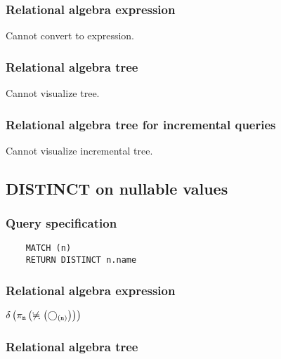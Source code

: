 	\subsubsection*{Relational algebra expression}

	Cannot convert to expression.

	\subsubsection*{Relational algebra tree}

	Cannot visualize tree.

	\subsubsection*{Relational algebra tree for incremental queries}

	Cannot visualize incremental tree.
	\subsection{DISTINCT on nullable values}

	\subsubsection*{Query specification}

	\begin{lstlisting}
	MATCH (n)
	RETURN DISTINCT n.name
	\end{lstlisting}


	\subsubsection*{Relational algebra expression}

	$\duplicateelimination \left(\projection{\var{n}} \left(\alldifferent{} \left(\getvertices{n}{}\right)\right)\right)$

	\subsubsection*{Relational algebra tree}


